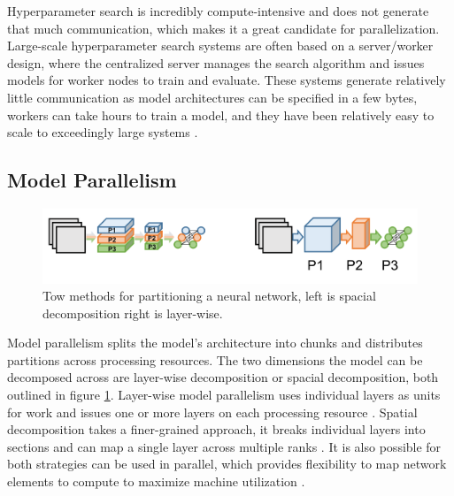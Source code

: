 Hyperparameter search is incredibly compute-intensive and does not generate that much communication, which makes it a great candidate for parallelization.
Large-scale hyperparameter search systems are often based on a server/worker design, where the centralized server manages the search algorithm and issues models for worker nodes to train and evaluate.
These systems generate relatively little communication as model architectures can be specified in a few bytes, workers can take hours to train a model, and they have been relatively easy to scale to exceedingly large systems \cite{Young2017EvolveNLWithHPC}.

\subsection{Model Parallelism}
\begin{figure}
    \centering
    \includegraphics[width=15cm]{3_Chapters/3_Chapter_DistributedDL/Figs/model_parallel_decomposition.png}
    \caption{Tow methods for partitioning a neural network,  left is spacial decomposition right is layer-wise.}
    \label{fig:model-parallel-decomposition}
\end{figure}
Model parallelism splits the model's architecture into chunks and distributes partitions across processing resources.
The two dimensions the model can be decomposed across are layer-wise decomposition or spacial decomposition, both outlined in figure \ref{fig:model-parallel-decomposition}.
Layer-wise model parallelism uses individual layers as units for work and issues one or more layers on each processing resource \cite{Abadi2015TensorflowWhitepaper}. 
Spatial decomposition takes a finer-grained approach, it breaks individual layers into sections and can map a single layer across multiple ranks \cite{VanEssen2015LBANN}.
It is also possible for both strategies can be used in parallel, which provides flexibility to map network elements to compute to maximize machine utilization \cite{Dean2012DistBelif}.


